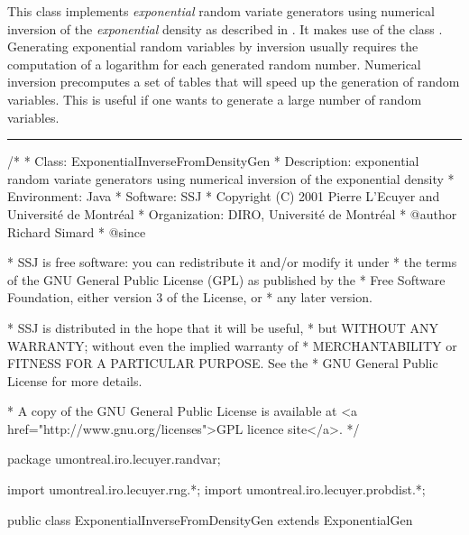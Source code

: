 
This class implements \emph{exponential} random variate generators
 using numerical inversion of the \emph{exponential} density
as described in \cite{rDER10a}. It makes use of the class
.
Generating exponential random variables by inversion usually requires
the computation of a logarithm for each generated random number.
Numerical inversion precomputes a set of tables that will speed up the
generation of random variables. This is useful if one 
wants to generate a large number of random variables.


\bigskip\hrule

\begin{code}
\begin{hide}
/*
 * Class:        ExponentialInverseFromDensityGen
 * Description:  exponential random variate generators using numerical
                 inversion of the exponential density
 * Environment:  Java
 * Software:     SSJ 
 * Copyright (C) 2001  Pierre L'Ecuyer and Université de Montréal
 * Organization: DIRO, Université de Montréal
 * @author       Richard Simard
 * @since

 * SSJ is free software: you can redistribute it and/or modify it under
 * the terms of the GNU General Public License (GPL) as published by the
 * Free Software Foundation, either version 3 of the License, or
 * any later version.

 * SSJ is distributed in the hope that it will be useful,
 * but WITHOUT ANY WARRANTY; without even the implied warranty of
 * MERCHANTABILITY or FITNESS FOR A PARTICULAR PURPOSE.  See the
 * GNU General Public License for more details.

 * A copy of the GNU General Public License is available at
   <a href="http://www.gnu.org/licenses">GPL licence site</a>.
 */
\end{hide}
package umontreal.iro.lecuyer.randvar;\begin{hide}
import umontreal.iro.lecuyer.rng.*;
import umontreal.iro.lecuyer.probdist.*;
\end{hide}

public class ExponentialInverseFromDensityGen extends ExponentialGen \begin{hide} {

\end{hide}\end{code}

